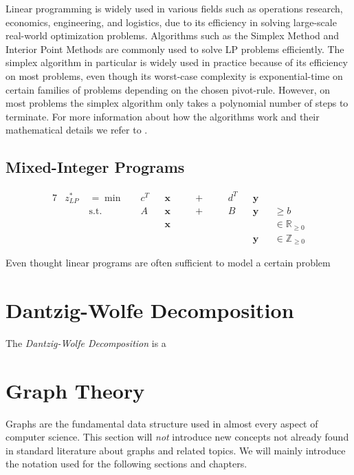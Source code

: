 		Linear programming is widely used in various fields such as operations research, economics, engineering, and logistics, due to its efficiency in solving large-scale real-world optimization problems. Algorithms such as the Simplex Method and Interior Point Methods are commonly used to solve LP problems efficiently.
		The simplex algorithm in particular is widely used in practice because of its efficiency on most problems, even though its worst-case complexity is exponential-time on certain families of problems depending on the chosen pivot-rule. 
		However, on most problems the simplex algorithm only takes a polynomial number of steps to terminate.
		For more information about how the algorithms work and their mathematical details we refer to \cite{BranchPrice}.
		
		\clearpage

		\subsection{Mixed-Integer Programs}
			\begin{alignat*}{7}
				&z^*_{LP} \; &={}	\min	&\quad  c^T && \mathbf{x} && \quad+\quad && d^T && \mathbf{y} \\
				&& \text{s.t.} & \quad A && \mathbf{x} && \quad+\quad  && B && \mathbf{y} && \geq b \\
				&&&&& \mathbf{x} &&&&&& &&\in \mathbb{R}_{\geq 0} \\
				&&&&&&&&&&& \mathbf{y} &&\in \mathbb{Z}_{\geq 0}
			\end{alignat*}
			
			Even thought linear programs are often sufficient to model a certain problem 
			
	
	\section{Dantzig-Wolfe Decomposition}
	
		The \textit{Dantzig-Wolfe Decomposition} is a 
	
		\clearpage
	
	\section{Graph Theory}
	
		Graphs are the fundamental data structure used in almost every aspect of computer science.
		This section will \textit{not} introduce new concepts not already found in standard literature about graphs and related topics.
		We will mainly introduce the notation used for the following sections and chapters.
	
